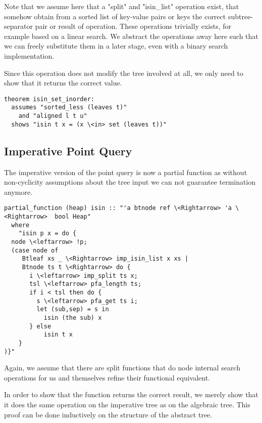 \documentclass[a4paper,UKenglish,cleveref, autoref, thm-restate]{lipics-v2021}
\begin{document}
Note that we assume here that a "split" and "isin\_list" operation exist,
that somehow obtain from a sorted list of key-value pairs or keys
the correct subtree-separator pair or result of operation.
These operations trivially exists, for example based on a linear search.
We abstract the operations away here such that we can freely substitute them in a
later stage, even with a binary search implementation.

Since this operation does not modify the tree involved at all,
we only need to show that it returns the correct value.

\begin{lstlisting}[mathescape=true, language=Isabelle,label=lst:isin-set-inorder]
theorem isin_set_inorder:
  assumes "sorted_less (leaves t)"
    and "aligned l t u"
  shows "isin t x = (x \<in> set (leaves t))"
\end{lstlisting}

\subsection{Imperative Point Query}
\label{sec:imperative_pq}

The imperative version of the point query is now a partial function
as without non-cyclicity assumptions about the tree input
we can not guarantee termination anymore.

\begin{lstlisting}[mathescape=true, language=Isabelle,label=lst:isin-imp-def]
partial_function (heap) isin :: "'a btnode ref \<Rightarrow> 'a \<Rightarrow>  bool Heap"
  where
    "isin p x = do {
  node \<leftarrow> !p;
  (case node of
     Btleaf xs _ \<Rightarrow> imp_isin_list x xs |
     Btnode ts t \<Rightarrow> do {
       i \<leftarrow> imp_split ts x;
       tsl \<leftarrow> pfa_length ts;
       if i < tsl then do {
         s \<leftarrow> pfa_get ts i;
         let (sub,sep) = s in
           isin (the sub) x
       } else
           isin t x
    }
)}"
\end{lstlisting}

Again, we assume that there are split functions that do node internal search operations for us
and themselves refine their functional equivalent.

In order to show that the function returns the correct result,
we merely show that it does the same operation on the imperative tree
as on the algebraic tree.
This proof can be done inductively on the structure of the abstract tree.
\end{document}
